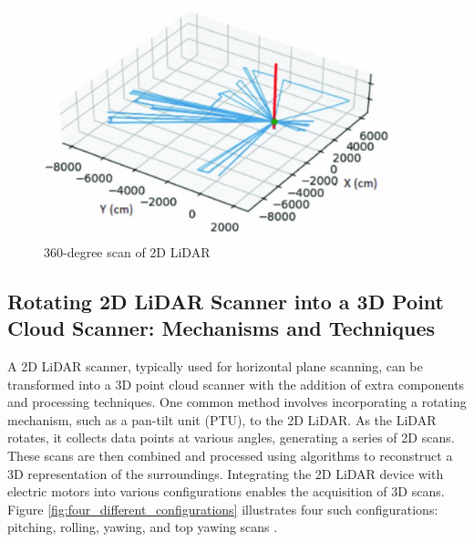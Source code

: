 \begin{figure}[H]
	\centering
	\includegraphics[width=0.9\textwidth]{Figures/360-degree-lidar-scan.png} %
	\caption{360-degree scan of 2D LiDAR}
	\label{fig:360-dgree-lidar-scan}
\end{figure}

\subsection{Rotating 2D LiDAR Scanner into a 3D Point Cloud Scanner: Mechanisms and Techniques}
A 2D LiDAR scanner, typically used for horizontal plane scanning, can be transformed into a 3D point cloud scanner with the addition of extra components and processing techniques. One common method involves incorporating a rotating mechanism, such as a pan-tilt unit (PTU), to the 2D LiDAR. As the LiDAR rotates, it collects data points at various angles, generating a series of 2D scans. These scans are then combined and processed using algorithms to reconstruct a 3D representation of the surroundings. Integrating the 2D LiDAR device with electric motors into various configurations enables the acquisition of 3D scans. Figure \ref{fig:four_different_configurations} illustrates four such configurations: pitching, rolling, yawing, and top yawing scans \citep{raj2020}.

